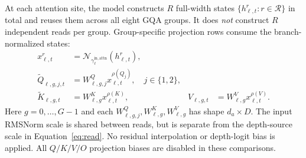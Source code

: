 \documentclass[11pt,letterpaper]{article}
\begin{document}
At each attention site, the model constructs $R$ full-width states
$\{h^r_{\ell,t}:r\in\mathcal{R}\}$ in total and reuses them across all eight
GQA groups. It does \emph{not} construct $R$ independent reads per group.
Group-specific projection rows consume the branch-normalized states:
\begin{align}
 x^r_{\ell,t}
   &=\mathcal{N}_{\gamma^{\mathrm{in,attn}}_\ell}(h^r_{\ell,t}),\\
 \widetilde Q_{\ell,g,j,t}
   &=W^Q_{\ell,g,j}x^{\rho(Q_j)}_{\ell,t},\quad j\in\{1,2\},\\
 \widetilde K_{\ell,g,t}
   &=W^K_{\ell,g}x^{\rho(K)}_{\ell,t},
 &V_{\ell,g,t}&=W^V_{\ell,g}x^{\rho(V)}_{\ell,t}.
 \label{eq:consumers}
\end{align}
Here $g=0,\ldots,G-1$ and each $W^Q_{\ell,g,j},W^K_{\ell,g},W^V_{\ell,g}$
has shape $d_a\times D$. The input RMSNorm scale is shared between reads, but
is separate from the depth-source scale in Equation~\ref{eq:read}. No residual
interpolation or depth-logit bias is applied. All $Q/K/V/O$ projection biases
are disabled in these comparisons.
\end{document}
